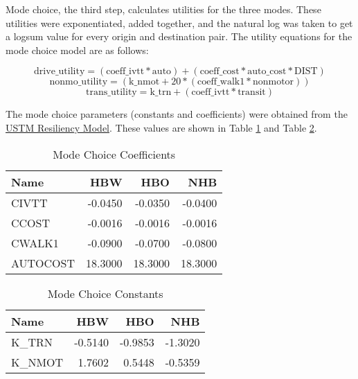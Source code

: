 \documentclass[3p, authoryear, review]{elsarticle} %
\begin{document}
Mode choice, the third step, calculates utilities for the three modes. These utilities were exponentiated, added together, and the natural log was taken to get a logsum value for every origin and destination pair. The utility equations for the mode choice model are as follows:

\begin{equation}
\mathrm{drive\_utility} = (\mathrm{coeff\_ivtt}*\mathrm{auto})+(\mathrm{coeff\_cost}*\mathrm{auto\_cost}*\mathrm{DIST})
\label{eq:driveutil}
\end{equation}
\begin{equation}
\mathrm{nonmo\_utility} = (\mathrm{k\_nmot}+ 20 * (\mathrm{coeff\_walk1}*\mathrm{nonmotor}))
\label{eq:nonmoutil}
\end{equation}
\begin{equation}
\mathrm{trans\_utility} = \mathrm{k\_trn} + (\mathrm{coeff\_ivtt}*\mathrm{transit})
\label{eq:transutil}
\end{equation}

The mode choice parameters (constants and coefficients) were obtained from the \href{https://github.com/byu-transpolab/ustm_resiliency}{USTM Resiliency Model}. These values are shown in Table \ref{tab:MCcoeff} and Table \ref{tab:MCconst}.

\begin{table}

\caption{\label{tab:MCcoeff}Mode Choice Coefficients}
\centering
\begin{tabular}[t]{lrrr}
\toprule
Name & HBW & HBO & NHB\\
\midrule
CIVTT & -0.0450 & -0.0350 & -0.0400\\
CCOST & -0.0016 & -0.0016 & -0.0016\\
CWALK1 & -0.0900 & -0.0700 & -0.0800\\
AUTOCOST & 18.3000 & 18.3000 & 18.3000\\
\bottomrule
\end{tabular}
\end{table}

\begin{table}

\caption{\label{tab:MCconst}Mode Choice Constants}
\centering
\begin{tabular}[t]{lrrr}
\toprule
Name & HBW & HBO & NHB\\
\midrule
K\_TRN & -0.5140 & -0.9853 & -1.3020\\
K\_NMOT & 1.7602 & 0.5448 & -0.5359\\
\bottomrule
\end{tabular}
\end{table}
\end{document}
